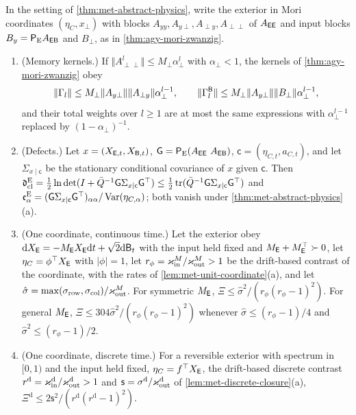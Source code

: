 \begin{proposition}\label{prop:met-memory}
In the setting of \cref{thm:met-abstract-physics}, write the exterior in Mori coordinates $(\eta_C,x_\perp)$ with blocks $A_{yy},A_{y\perp},A_{\perp y},A_{\perp\perp}$ of $A_{\mathsf{E}\mathsf{E}}$ and input blocks $B_y=\mathsf P_{\mathrm E}A_{\mathsf{E}\mathsf{B}}$ and $B_\perp$, as in \cref{thm:agy-mori-zwanzig}.
\begin{enumerate}
\item[(a)] (Memory kernels.) If $\Vert A_{\perp\perp}^l\Vert\le M_\perp\alpha_\perp^l$ with $\alpha_\perp<1$, the kernels of \cref{thm:agy-mori-zwanzig} obey
\[
\Vert\Gamma_l\Vert\le M_\perp\Vert A_{y\perp}\Vert\Vert A_{\perp y}\Vert\alpha_\perp^{l-1},\qquad\Vert\Gamma^{\mathsf{B}}_l\Vert\le M_\perp\Vert A_{y\perp}\Vert\Vert B_\perp\Vert\alpha_\perp^{l-1},
\]
and their total weights over $l\ge1$ are at most the same expressions with $\alpha_\perp^{l-1}$ replaced by $(1-\alpha_\perp)^{-1}$.
\item[(b)] (Defects.) Let $x=(X_{\mathsf{E},t},X_{\mathsf{B},t})$, $\mathsf G=\mathsf P_{\mathrm E}(A_{\sE\sE}\ A_{\sE\sB})$, $\mathsf c=(\eta_{C,t},a_{C,t})$, and let $\Sigma_{x\mid\mathsf c}$ be the stationary conditional covariance of $x$ given $\mathsf c$. Then $\mathfrak d^{\mathrm E}_{\mathrm{cl}}=\frac12\ln\det(I+\bar Q^{-1}\mathsf G\Sigma_{x\mid\mathsf c}\mathsf G^\top)\le\frac12\operatorname{tr}(\bar Q^{-1}\mathsf G\Sigma_{x\mid\mathsf c}\mathsf G^\top)$ and $\mathfrak e^{\mathrm E}_\alpha=(\mathsf G\Sigma_{x\mid\mathsf c}\mathsf G^\top)_{\alpha\alpha}/\operatorname{Var}(\eta_{C,\alpha})$; both vanish under \cref{thm:met-abstract-physics}(a).
\item[(c)] (One coordinate, continuous time.) Let the exterior obey $\mathrm dX_{\mathsf{E}}=-M_{\mathsf{E}}X_{\mathsf{E}}\mathrm dt+\sqrt2\mathrm d\mathsf B_t$ with the input held fixed and $M_{\mathsf{E}}+M_{\mathsf{E}}^\top\succ0$, let $\eta_C=\phi^\top X_{\mathsf{E}}$ with $\lvert\phi\rvert=1$, let $r_\phi=\varkappa_{\mathrm{in}}^M/\varkappa_{\mathrm{out}}^M>1$ be the drift-based contrast of the coordinate, with the rates of \cref{lem:met-unit-coordinate}(a), and let $\hat\sigma=\max(\sigma_{\mathrm{row}},\sigma_{\mathrm{col}})/\varkappa_{\mathrm{out}}^M$. For symmetric $M_{\mathsf{E}}$, $\Xi\le\hat\sigma^2/(r_\phi(r_\phi-1)^2)$. For general $M_{\mathsf{E}}$, $\Xi\le304\hat\sigma^2/(r_\phi(r_\phi-1)^2)$ whenever $\hat\sigma\le(r_\phi-1)/4$ and $\hat\sigma^2\le(r_\phi-1)/2$.
\item[(d)] (One coordinate, discrete time.) For a reversible exterior with spectrum in $[0,1)$ and the input held fixed, $\eta_C=f^\top X_{\mathsf{E}}$, the drift-based discrete contrast $r^{\mathrm d}=\varkappa_{\mathrm{in}}^{\mathrm d}/\varkappa_{\mathrm{out}}^{\mathrm d}>1$ and $\mathsf s=\sigma^{\mathrm d}/\varkappa_{\mathrm{out}}^{\mathrm d}$ of \cref{lem:met-discrete-closure}(a), $\Xi^{\mathrm d}\le2\mathsf s^2/(r^{\mathrm d}(r^{\mathrm d}-1)^2)$.
\end{enumerate}
\end{proposition}
